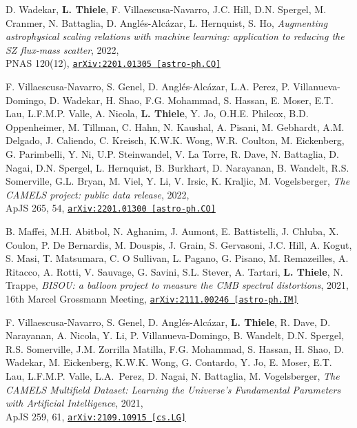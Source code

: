 D. Wadekar, {\bf L. Thiele}, F. Villaescusa-Navarro, J.C. Hill, D.N. Spergel,
M. Cranmer, N. Battaglia, D. Angl\'es-Alc\'azar, L. Hernquist, S. Ho,
\emph{Augmenting astrophysical scaling relations with machine learning:
      application to reducing the SZ flux-mass scatter}, 2022,\\
PNAS 120(12),
\href{https://arxiv.org/abs/2201.01305}{\mbox{\texttt{arXiv:2201.01305 [astro-ph.CO]}}}

F. Villaescusa-Navarro, S. Genel, D. Angl\'es-Alc\'azar,
L.A. Perez, P. Villanueva-Domingo, D. Wadekar, H. Shao,
F.G. Mohammad, S. Hassan, E. Moser, E.T. Lau, L.F.M.P. Valle, A. Nicola,
{\bf L. Thiele}, Y. Jo, O.H.E. Philcox, B.D. Oppenheimer, M. Tillman, C. Hahn,
N. Kaushal, A. Pisani, M. Gebhardt, A.M. Delgado, J. Caliendo,
C. Kreisch, K.W.K. Wong, W.R. Coulton, M. Eickenberg,
G. Parimbelli, Y. Ni, U.P. Steinwandel, V. La Torre,
R. Dave, N. Battaglia, D. Nagai, D.N. Spergel, L. Hernquist, B. Burkhart,
D. Narayanan, B. Wandelt, R.S. Somerville, G.L. Bryan, M. Viel, Y. Li, V. Irsic,
K. Kraljic, M. Vogelsberger,
\emph{The CAMELS project: public data release}, 2022,\\
ApJS 265, 54,
\href{https://arxiv.org/abs/2201.01300}{\mbox{\texttt{arXiv:2201.01300 [astro-ph.CO]}}}

B. Maffei, M.H. Abitbol, N. Aghanim, J. Aumont, E. Battistelli, J. Chluba,
X. Coulon, P. De Bernardis, M. Douspis, J. Grain, S. Gervasoni, J.C. Hill,
A. Kogut, S. Masi, T. Matsumara, C. O Sullivan, L. Pagano, G. Pisano,
M. Remazeilles, A. Ritacco, A. Rotti, V. Sauvage, G. Savini, S.L. Stever,
A. Tartari, {\bf L. Thiele}, N. Trappe,
\emph{BISOU: a balloon project to measure the CMB spectral distortions}, 2021,\\
16th Marcel Grossmann Meeting,
\href{https://arxiv.org/abs/2111.00246}{\mbox{\texttt{arXiv:2111.00246 [astro-ph.IM]}}}

F. Villaescusa-Navarro, S. Genel, D. Angl\'es-Alc\'azar, {\bf L. Thiele},
R. Dave, D. Narayanan, A. Nicola, Y. Li, P. Villanueva-Domingo, B. Wandelt,
D.N. Spergel, R.S. Somerville, J.M. Zorrilla Matilla, F.G. Mohammad, S. Hassan,
H. Shao, D. Wadekar, M. Eickenberg, K.W.K. Wong, G. Contardo, Y. Jo, E. Moser,
E.T. Lau, L.F.M.P. Valle, L.A.~Perez, D. Nagai, N. Battaglia, M. Vogelsberger,
\emph{The CAMELS Multifield Dataset: Learning the Universe's Fundamental
      Parameters with Artificial Intelligence}, 2021,\\
ApJS 259, 61,
\href{https://arxiv.org/abs/2109.10915}{\mbox{\texttt{arXiv:2109.10915 [cs.LG]}}}

